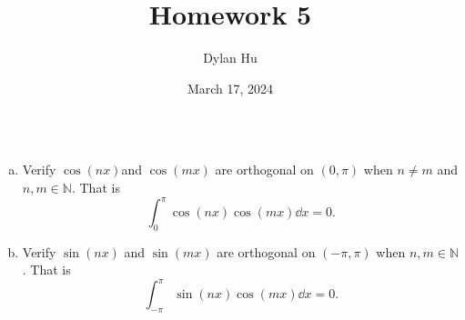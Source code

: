 \documentclass[plain]{pset}
\title{Homework 5}
\author{Dylan Hu}
\date{March 17, 2024}
\begin{document}
\begin{multicols}{2}
    \raggedcolumns{}
    \maketitle
    \columnbreak{}
    \tableofcontents
\end{multicols}

\setlength{\parskip}{1em}
\setlength{\parindent}{0pt}

\pagebreak

\begin{problem}
\[\]
\vspace{-4em}
\begin{enumerate}[a.]
    \item Verify \(\cos(nx)\)and \(\cos(mx)\) are orthogonal on \((0, \pi)\) when \(n \neq m\) and \(n, m \in \mathbb{N}\). That is
          \[
              \int_0^\pi \cos(nx)\cos(mx) \dd x= 0.
          \]
    \item Verify \(\sin(nx)\) and \(\sin(mx)\) are orthogonal on \((-\pi, \pi)\) when \(n, m \in \mathbb{N}\). That is
          \[
              \int_{-\pi}^\pi \sin(nx)\cos(mx) \dd x= 0.
          \]
\end{enumerate}
\end{problem}
\end{document}
